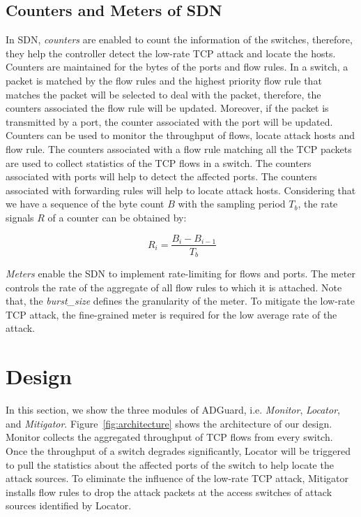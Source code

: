 \documentclass[conference]{IEEEtran}
\newcommand{\TheName}{ADGuard}
\begin{document}
\subsection{Counters and Meters of SDN}
In SDN, \emph{counters} are enabled to count the information of the switches, therefore, they help the controller detect the low-rate TCP attack and locate the hosts. Counters are maintained for the bytes of the ports and flow rules. In a switch, a packet is matched by the flow rules and the highest priority flow rule that matches the packet will be selected to deal with the packet, therefore, the counters associated the flow rule will be updated. Moreover, if the packet is transmitted by a port, the counter associated with the port will be updated. Counters can be used to monitor the throughput of flows, locate attack hosts and flow rule. The counters associated with a flow rule matching all the TCP packets are used to collect statistics of the TCP flows in a switch. The counters associated with ports will help to detect the affected ports. The counters associated with forwarding rules will help to locate attack hosts. Considering that we have a sequence of the byte count $B$ with the sampling period $T_b$, the rate signals $R$ of a counter can be obtained by:

\vspace{-0.05in}
\begin{equation}\label{eq:sampling}
\ R_i=\frac{B_i - B_{i - 1}}{T_b}
\end{equation}

\textit{Meters} enable the SDN to implement rate-limiting for flows and ports. The meter controls the rate of the aggregate of all flow rules to which it is attached. Note that, the \emph{burst\_size} defines the granularity of the meter. To mitigate the low-rate TCP attack, the fine-grained meter is required for the low average rate of the attack.

\section{Design}
In this section, we show the three modules of \TheName{}, i.e. \emph{Monitor}, \emph{Locator}, and \emph{Mitigator}. Figure~\ref{fig:architecture} shows the architecture of our design. Monitor collects the aggregated throughput of TCP flows from every switch. Once the throughput of a switch degrades significantly, Locator will be triggered to pull the statistics about the affected ports of the switch to help locate the attack sources. To eliminate the influence of the low-rate TCP attack, Mitigator installs flow rules to drop the attack packets at the access switches of attack sources identified by Locator.
\end{document}
